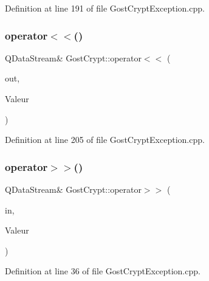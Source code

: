 Definition at line 191 of file Gost\+Crypt\+Exception.\+cpp.

\mbox{\label{namespace_gost_crypt_ae710832b03f99b679035bfeee67a2fb0}} 
\subsubsection{\texorpdfstring{operator$<$$<$()}{operator<<()}\hspace{0.1cm}{\footnotesize\ttfamily [13/13]}}
{\footnotesize\ttfamily Q\+Data\+Stream\& Gost\+Crypt\+::operator$<$$<$ (\begin{DoxyParamCaption}\item[{Q\+Data\+Stream \&}]{out,  }\item[{const \hyperlink{class_gost_crypt_1_1_invalid_parameter}{Gost\+Crypt\+::\+Invalid\+Parameter} \&}]{Valeur }\end{DoxyParamCaption})}



Definition at line 205 of file Gost\+Crypt\+Exception.\+cpp.

\mbox{\label{namespace_gost_crypt_ab6b04c752149af5db0d728d0c6582f58}} 
\subsubsection{\texorpdfstring{operator$>$$>$()}{operator>>()}\hspace{0.1cm}{\footnotesize\ttfamily [1/13]}}
{\footnotesize\ttfamily Q\+Data\+Stream\& Gost\+Crypt\+::operator$>$$>$ (\begin{DoxyParamCaption}\item[{Q\+Data\+Stream \&}]{in,  }\item[{\hyperlink{class_gost_crypt_1_1_gost_crypt_exception}{Gost\+Crypt\+::\+Gost\+Crypt\+Exception} \&}]{Valeur }\end{DoxyParamCaption})}



Definition at line 36 of file Gost\+Crypt\+Exception.\+cpp.

\mbox{\label{namespace_gost_crypt_a7d483519a72417af318b33cdcd0b2ac0}} 
